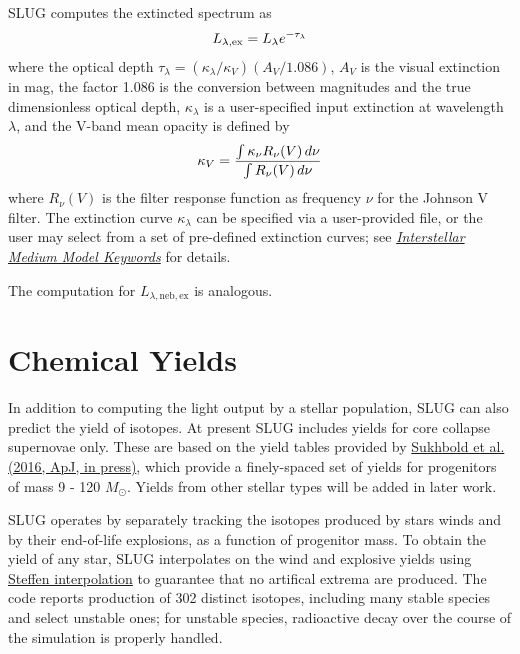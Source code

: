 \documentclass[letterpaper,10pt,english]{sphinxmanual}
\begin{document}
SLUG computes the extincted spectrum as
\begin{gather}
\begin{split}L_{\lambda,\mathrm{ex}} = L_{\lambda} e^{-\tau_\lambda}\end{split}\notag
\end{gather}
where the optical depth \(\tau_\lambda = (\kappa_\lambda / \kappa_V) (A_V/1.086)\), \(A_V\) is the visual extinction in mag, the factor 1.086 is the conversion between magnitudes and the true dimensionless optical depth, \(\kappa_\lambda\) is a user-specified input extinction at wavelength \(\lambda\), and the V-band mean opacity is defined by
\begin{gather}
\begin{split}\kappa_V = \frac{\int \kappa_\nu R_\nu(V) \, d\nu}{\int R_\nu(V) \, d\nu}\end{split}\notag
\end{gather}
where \(R_\nu(V)\) is the filter response function as frequency \(\nu\) for the Johnson V filter. The extinction curve \(\kappa_\lambda\) can be specified via a user-provided file, or the user may select from a set of pre-defined extinction curves; see {\hyperref[parameters:ssec\string-ism\string-keywords]{\emph{Interstellar Medium Model Keywords}}} for details.

The computation for \(L_{\lambda,\mathrm{neb,ex}}\) is analogous.


\section{Chemical Yields}
\label{intro:chemical-yields}\label{intro:ssec-yields}
In addition to computing the light output by a stellar population, SLUG can also predict the yield of isotopes. At present SLUG includes yields for core collapse supernovae only. These are based on the yield tables provided by \href{http://adsabs.harvard.edu/abs/2015arXiv151004643S/abstract}{Sukhbold et al. (2016, ApJ, in press)}, which provide a finely-spaced set of yields for progenitors of mass 9 - 120 \(M_\odot\). Yields from other stellar types will be added in later work.

SLUG operates by separately tracking the isotopes produced by stars winds and by their end-of-life explosions, as a function of progenitor mass. To obtain the yield of any star, SLUG interpolates on the wind and explosive yields using \href{http://adsabs.harvard.edu/abs/1990A\%26A...239..443S}{Steffen interpolation} to guarantee that no artifical extrema are produced. The code reports production of 302 distinct isotopes, including many stable species and select unstable ones; for unstable species, radioactive decay over the course of the simulation is properly handled.
\end{document}
